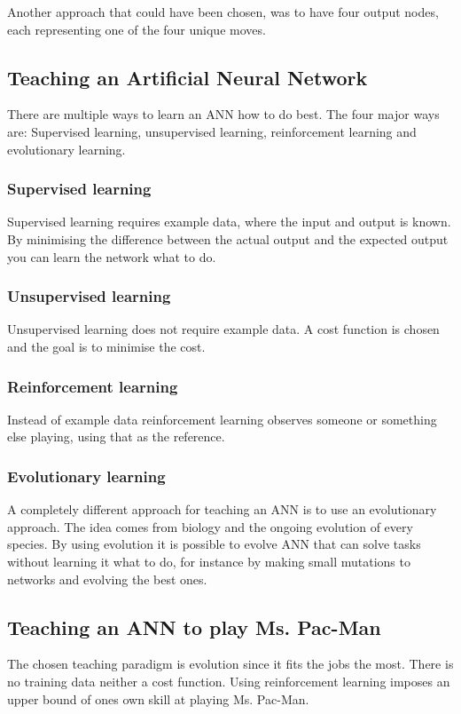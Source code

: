 Another approach that could have been chosen, was to have four output nodes, each representing one of the four unique moves.



\subsection{Teaching an Artificial Neural Network}
There are multiple ways to learn an ANN how to do best. The four major ways are: Supervised learning, unsupervised learning, reinforcement learning and evolutionary learning.

\subsubsection{Supervised learning}
Supervised learning requires example data, where the input and output is known. By minimising the difference between the actual output and the expected output you can learn the network what to do.

\subsubsection{Unsupervised learning}
Unsupervised learning does not require example data. A cost function is chosen and the goal is to minimise the cost.

\subsubsection{Reinforcement learning}
Instead of example data reinforcement learning observes someone or something else playing, using that as the reference.

\subsubsection{Evolutionary learning}
A completely different approach for teaching an ANN is to use an evolutionary approach. The idea comes from biology and the ongoing evolution of every species. By using evolution it is possible to evolve ANN that can solve tasks without learning it what to do, for instance by making small mutations to networks and evolving the best ones.

\subsection{Teaching an ANN to play Ms. Pac-Man}
The chosen teaching paradigm is evolution since it fits the jobs the most. There is no training data neither a cost function. Using reinforcement learning imposes an upper bound of ones own skill at playing Ms. Pac-Man.

